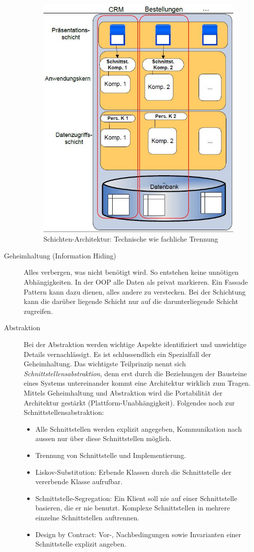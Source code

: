 \begin{description}
	\begin{figure}[h!]
	\centering
	\includegraphics[width=0.6\linewidth]{fig/schichten-architektur}
	\caption{Schichten-Architektur: Technische wie fachliche Trennung}
	\label{fig:schichten-architektur}
	\end{figure}

	\item[Geheimhaltung (Information Hiding)] Alles verbergen, was nicht benötigt wird. So entstehen keine unnötigen Abhängigkeiten. In der OOP alle Daten als privat markieren. Ein Fassade Pattern kann dazu dienen, alles andere zu verstecken. Bei der Schichtung kann die darüber liegende Schicht nur auf die darunterliegende Schicht zugreifen.
	
	\item[Abstraktion] Bei der Abstraktion werden wichtige Aspekte identifiziert und unwichtige Details vernachlässigt. Es ist schlussendlich ein Spezialfall der Geheimhaltung. Das wichtigste Teilprinzip nennt sich \emph{Schnittstellensabstraktion}, denn erst durch die Beziehungen der Bausteine eines Systems untereinander kommt eine Architektur wirklich zum Tragen. Mittels Geheimhaltung und Abstraktion wird die Portabilität der Architektur gestärkt (Plattform-Unabhängigkeit). Folgendes noch zur Schnittstellensabstraktion:
	
	\begin{itemize}
		\item Alle Schnittstellen werden explizit angegeben, Kommunikation nach aussen nur über diese Schnittstellen möglich.
		\item Trennung von Schnittstelle und Implementierung.
		\item Liskov-Substitution: Erbende Klassen durch die Schnittstelle der vererbende Klasse aufrufbar.
		\item Schnittstelle-Segregation: Ein Klient soll nie auf einer Schnittstelle basieren, die er nie benutzt. Komplexe Schnittstellen in mehrere einzelne Schnittstellen auftrennen.
		\item Design by Contract: Vor-, Nachbedingungen sowie Invarianten einer Schnittstelle explizit angeben.
	\end{itemize}
		

\end{description}
